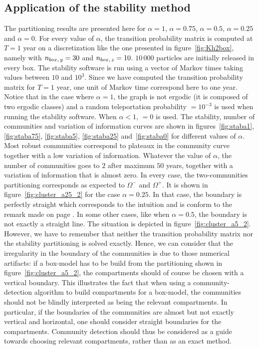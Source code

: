 \subsection{Application of the stability method}
The partitioning results are presented here for $\alpha = 1$, $\alpha = 0.75$, $\alpha = 0.5$, $\alpha = 0.25$ and $\alpha = 0$. For every value of $\alpha$, the transition probability matrix is computed at $T = 1$ year on a discretization like the one presented in figure~\ref{fig:Kh2box}, namely with $n_{box,\,y} = 30$ and $n_{box,\,z} = 10$. $10\,000$ particles are initially released in every box. The stability software is run using a vector of Markov times taking values between $10$ and $10^3$. Since we have computed the transition probability matrix for $T = 1$ year, one unit of Markov time correspond here to one year. Notice that in the case where $\alpha = 1$, the graph is not ergodic (it is composed of two ergodic classes) and a random teleportation probability  $= 10^{-3}$ is used when running the stability software. When $\alpha < 1$,  $=0$ is used.
The stability, number of communities and variation of information curves are shown in figures~\ref{fig:staba1}, \ref{fig:staba75}, \ref{fig:staba5}, \ref{fig:staba25} and~\ref{fig:staba0} for different values of $\alpha$. Most robust communities correspond to plateaux in the community curve together with a low variation of information. Whatever the value of $\alpha$, the number of communities goes to $2$ after maximum $50$ years, together with a variation of information that is almost zero. In every case, the two-communities partitioning corresponds as expected to $\Omega^-$ and $\Omega^+$. It is shown in figure~\ref{fig:cluster_a25_2} for the case $\alpha = 0.25$. In that case, the boundary is perfectly straight which corresponds to the intuition and is conform to the remark made on page \pageref{remark:straightboundaries}. In some other cases, like when $\alpha = 0.5$, the boundary is not exactly a straight line. The situation is depicted in figure~\ref{fig:cluster_a5_2}. However, we have to remember that neither the transition probability matrix nor the stability partitioning is solved exactly. Hence, we can consider that the irregularity in the boundary of the communities is due to those numerical artifacts: if a box-model has to be build from the partitioning shown in figure~\ref{fig:cluster_a5_2}, the compartments should of course be chosen with a vertical boundary. This illustrates the fact that when using a community-detection algorithm to build compartments for a box-model, the communities should not be blindly interpreted as being the relevant compartments. In particular, if the boundaries of the communities are almost but not exactly vertical and horizontal, one should consider straight boundaries for the compartments. Community detection should thus be considered as a guide towards choosing relevant compartments, rather than as an exact method.

